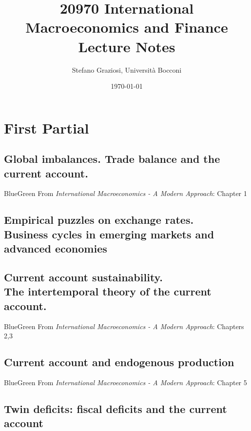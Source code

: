 \documentclass[usenames,dvipsnames,12pt]{book}
\title{20970 International Macroeconomics and Finance \\[1cm] \textbf{Lecture Notes}}
\author{Stefano Graziosi, Università Bocconi}
\date{\today}
\begin{document}
\maketitle

\tableofcontents

\part{First Partial}

    \chapter[Global imbalances]{Global imbalances. Trade balance and the current account.}

        \begin{mybox}{BlueGreen}{}
            From \textit{International Macroeconomics - A Modern Approach}: Chapter 1
        \end{mybox}

    \chapter[Empirical puzzles on exchange rates]{Empirical puzzles on exchange rates. \\ Business cycles in emerging markets and advanced economies}

    \chapter[Current account sustainability]{Current account sustainability. \\ The intertemporal theory of the current account.}

        \begin{mybox}{BlueGreen}{}
            From \textit{International Macroeconomics - A Modern Approach}: Chapters 2,3
        \end{mybox}

    \chapter{Current account and endogenous production}

        \begin{mybox}{BlueGreen}{}
            From \textit{International Macroeconomics - A Modern Approach}: Chapter 5
        \end{mybox}

    \chapter[Twin deficits]{Twin deficits: fiscal deficits and the current account}
\end{document}

